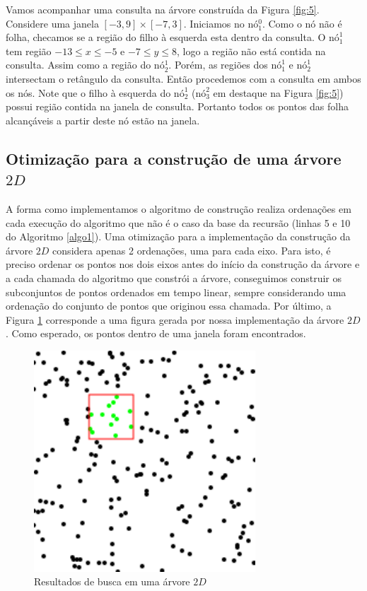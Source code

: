 Vamos acompanhar uma consulta na árvore construída da Figura \ref{fig:5}. Considere uma janela $[-3, 9]\times[-7, 3]$. %
Iniciamos no nó$^0_1$. Como o nó não é folha, checamos se a região do filho à esquerda esta dentro da consulta. O $\mbox{nó}^1_1$ tem região $ -13 \leq x \leq -5 $ e  $ -7 \leq y \leq 8$, logo a região não está contida na consulta. Assim como a região do nó$^1_2$. Porém, as regiões dos $\mbox{nó}^1_1$ e $\mbox{nó}^1_2$ intersectam o retângulo da consulta. Então procedemos com a consulta em ambos os nós. %
Note que o filho à esquerda do $\mbox{nó}^1_2$ ($\mbox{nó}^2_3$ em destaque na Figura \ref{fig:5}) possui região contida na janela de consulta. Portanto todos os pontos das folha alcançáveis a partir deste nó estão na janela. 

\subsection{Otimização para a construção de uma árvore $2D$}
A forma como implementamos o algoritmo de construção realiza ordenações em cada execução do algoritmo que não é o caso da base da recursão (linhas 5 e 10 do Algoritmo \ref{algo1}).
Uma otimização para a implementação da construção da árvore $2D$ considera apenas 2 ordenações, uma para cada eixo. %
Para isto, é preciso ordenar os pontos nos dois eixos antes do início da construção da árvore e a cada chamada do algoritmo que constrói a árvore, conseguimos construir os subconjuntos de pontos ordenados em tempo linear, sempre considerando uma ordenação do conjunto de pontos que originou essa chamada. %
Por último, a Figura \ref{fig:7} corresponde a uma figura gerada por nossa implementação da árvore $2D$. Como esperado, os pontos dentro de uma janela foram encontrados.

\begin{figure}[t!]
    \begin{center}
        \includegraphics{images/points.pdf}
    \end{center}
    \caption {Resultados de busca em uma árvore $2D$}
    \label{fig:7}
\end{figure}

